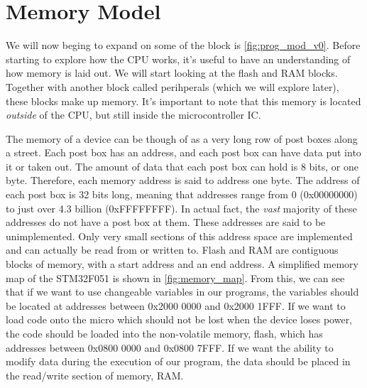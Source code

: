 \chapter{Memory Model}
We will now beging to expand on some of the block is \autoref{fig:prog_mod_v0}. Before starting to explore how the CPU works, it's useful to have an understanding of how memory is laid out. We will start looking at the flash and RAM blocks. Together with another block called perihperals (which we will explore later), these blocks make up memory. 
It's important to note that this memory is located \emph{outside} of the CPU, but still inside the microcontroller IC.

The memory of a device can be though of as a very long row of post boxes along a street. 
Each post box has an address, and each post box can have data put into it or taken out. The amount of data that each post box can hold is 8 bits, or one byte. Therefore, each memory address is said to address one byte. 
The address of each post box is 32 bits long, meaning that addresses range from 0 (0x00000000) to just over 4.3 billion (0xFFFFFFFF). In actual fact, the \emph{vast} majority of these addresses do not have a post box at them. These addresses are said to be unimplemented. 
Only very small sections of this address space are implemented and can actually be read from or written to.
Flash and RAM are contiguous blocks of memory, with a start address and an end address. A simplified memory map of the STM32F051 is shown in \autoref{fig:memory_map}. From this, we can see that if we want to use changeable variables in our programs, the variables should be located at addresses between 0x2000 0000 and 0x2000 1FFF. If we want to load code onto the micro which should not be lost when the device loses power, the code should be loaded into the non-volatile memory, flash, which has addresses between 0x0800 0000 and 0x0800 7FFF.
If we want the ability to modify data during the execution of our program, the data should be placed in the read/write section of memory, RAM. 

